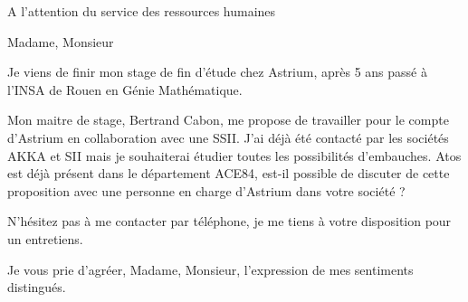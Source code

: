 \documentclass[12pt]{lettre}
\begin{document}
 
\begin{letter}{A l'attention du service des ressources humaines}
\address{Victor Cameo Ponz\\47 rue Guynemer\\31200 Toulouse}
\nofax

\opening{Madame, Monsieur}

Je viens de finir mon stage de fin d'étude chez Astrium, après 5 ans passé à l'INSA de Rouen en Génie Mathématique. 

Mon maitre de stage, Bertrand Cabon, me propose de travailler pour le compte d'Astrium en collaboration avec une SSII. J'ai déjà été contacté par les sociétés AKKA et SII mais je souhaiterai étudier toutes les possibilités d'embauches.
Atos est déjà présent dans le département ACE84, est-il possible de discuter de cette proposition avec une personne en charge d'Astrium dans votre société ?

N'hésitez pas à me contacter par téléphone, je me tiens à votre disposition pour un entretiens.

\closing{Je vous prie d'agréer, Madame, Monsieur, l'expression de mes sentiments distingués.}
\end{letter}
 
\end{document}
